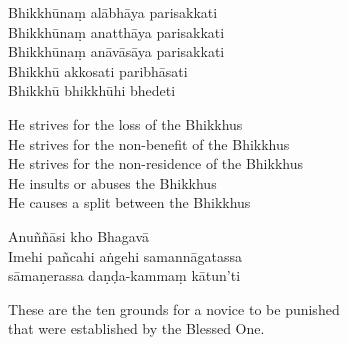 Bhikkhūnaṃ alābhāya parisakkati\\
Bhikkhūnaṃ anatthāya parisakkati\\
Bhikkhūnaṃ anāvāsāya parisakkati\\
Bhikkhū akkosati paribhāsati\\
Bhikkhū bhikkhūhi bhedeti

\begin{english}
  He strives for the loss of the Bhikkhus\\
  He strives for the non-benefit of the Bhikkhus\\
  He strives for the non-residence of the Bhikkhus\\
  He insults or abuses the Bhikkhus\\
  He causes a split between the Bhikkhus
\end{english}

Anuññāsi kho Bhagavā\\
Imehi pañcahi aṅgehi samannāgatassa\\
sāmaṇerassa daṇḍa-kammaṃ kātun'ti

\begin{english}
  These are the ten grounds for a novice to be punished\\
  that were established by the Blessed One.
\end{english}


